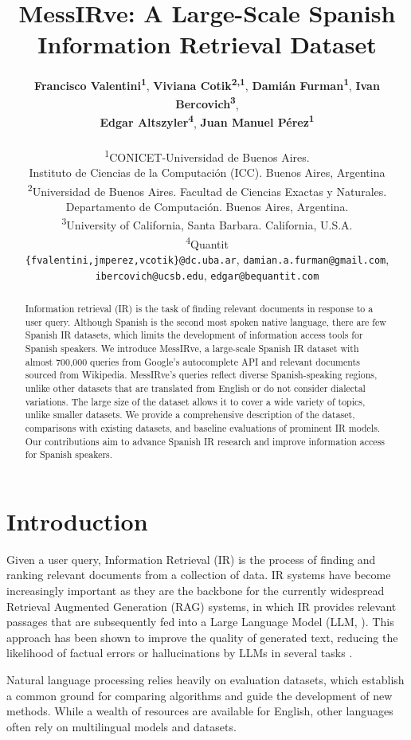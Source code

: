 \documentclass[11pt]{article}
\title{
  MessIRve: A Large-Scale Spanish Information Retrieval Dataset
}
\author{
 \textbf{Francisco Valentini\textsuperscript{1}},
 \textbf{Viviana Cotik\textsuperscript{2,1}},
 \textbf{Damián Furman\textsuperscript{1}},
 \textbf{Ivan Bercovich\textsuperscript{3}},
\\
 \textbf{Edgar Altszyler\textsuperscript{4}},
 \textbf{Juan Manuel Pérez\textsuperscript{1}}
\\
\\
 \textsuperscript{1}CONICET-Universidad de Buenos Aires.\\Instituto de Ciencias de la Computación (ICC). Buenos Aires, Argentina\\
 \textsuperscript{2}Universidad de Buenos Aires. Facultad de Ciencias Exactas y Naturales.\\Departamento de Computación. Buenos Aires, Argentina.\\
 \textsuperscript{3}University of California, Santa Barbara. California, U.S.A.\\
 \textsuperscript{4}Quantit\\
   \small{\texttt{\{fvalentini,jmperez,vcotik\}@dc.uba.ar},}
   \small{\texttt{damian.a.furman@gmail.com},}\\[-0.3em]
   \small{\texttt{ibercovich@ucsb.edu},}
   \small{\texttt{edgar@bequantit.com}}
}
\begin{document}
\maketitle

\begin{abstract}
  Information retrieval (IR) is the task of finding relevant documents in response to a user query. Although Spanish is the second most spoken native language, there are few Spanish IR datasets, which limits the development of information access tools for Spanish speakers. We introduce MessIRve, a large-scale Spanish IR dataset with almost 700,000 queries from Google's autocomplete API and relevant documents sourced from Wikipedia. MessIRve's queries reflect diverse Spanish-speaking regions, unlike other datasets that are translated from English or do not consider dialectal variations. The large size of the dataset allows it to cover a wide variety of topics, unlike smaller datasets. We provide a comprehensive description of the dataset, comparisons with existing datasets, and baseline evaluations of prominent IR models. Our contributions aim to advance Spanish IR research and improve information access for Spanish speakers.
\end{abstract}


\section{Introduction} \label{sec:introduction}

Given a user query, Information Retrieval (IR) is the process of finding and ranking relevant documents from a collection of data. IR systems have become increasingly important as they are the backbone for the currently widespread Retrieval Augmented Generation (RAG) systems, in which IR provides relevant passages that are subsequently fed into a Large Language Model (LLM, \citealp{lewis2020retrieval,izacard2023atlas,ram2023incontext,shi2024replug}). This approach has been shown to improve the quality of generated text, reducing the likelihood of factual errors or hallucinations by LLMs in several tasks \citep{cheng2023uprise,jiang2023active,cheng2024lift,lin2024radit}.

Natural language processing relies heavily on evaluation datasets, which establish a common ground for comparing algorithms and guide the development of new methods. While a wealth of resources are available for English, other languages often rely on multilingual models and datasets.
\end{document}
